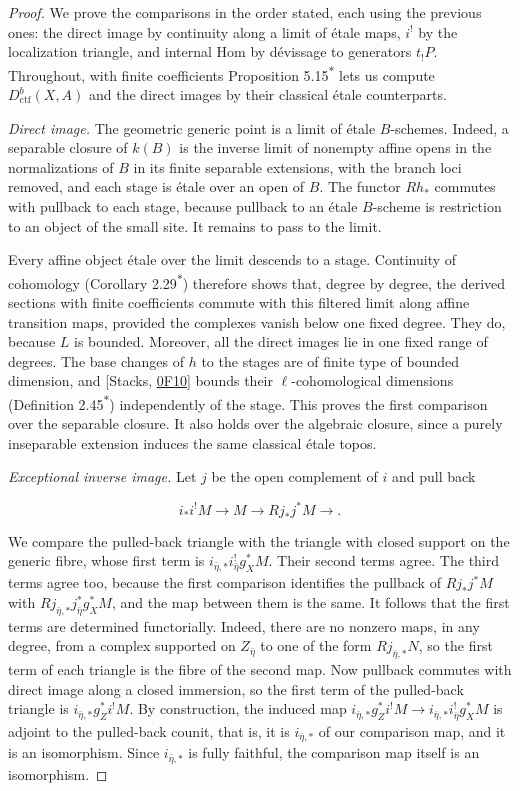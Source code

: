 \documentclass[11pt]{article}
\newcommand{\bpout}[1]{#1\textsuperscript{\hyperlink{bp-outside}{\ensuremath{\ast}}}}
\begin{document}
\begin{proof}[{Proof}]\label{bp20}%
We prove the comparisons in the order stated, each using the previous ones: the direct image by continuity along a limit of étale maps, \(i^!\) by the localization triangle, and internal Hom by dévissage to generators \(t_!P\). Throughout, with finite coefficients Proposition \bpout{5.15} lets us compute \(D^b_{\mathrm{ctf}}(X,A)\) and the direct images by their classical étale counterparts.

\emph{Direct image.} The geometric generic point is a limit of étale \(B\)-schemes. Indeed, a separable closure of \(k(B)\) is the inverse limit of nonempty affine opens in the normalizations of \(B\) in its finite separable extensions, with the branch loci removed, and each stage is étale over an open of \(B\). The functor \(Rh_*\) commutes with pullback to each stage, because pullback to an étale \(B\)-scheme is restriction to an object of the small site. It remains to pass to the limit.

Every affine object étale over the limit descends to a stage. Continuity of cohomology (Corollary \bpout{2.29}) therefore shows that, degree by degree, the derived sections with finite coefficients commute with this filtered limit along affine transition maps, provided the complexes vanish below one fixed degree. They do, because \(L\) is bounded. Moreover, all the direct images lie in one fixed range of degrees. The base changes of \(h\) to the stages are of finite type of bounded dimension, and [Stacks, \href{https://stacks.math.columbia.edu/tag/0F10}{0F10}] bounds their \(\ell\)-cohomological dimensions (Definition \bpout{2.45}) independently of the stage. This proves the first comparison over the separable closure. It also holds over the algebraic closure, since a purely inseparable extension induces the same classical étale topos.

\emph{Exceptional inverse image.} Let \(j\) be the open complement of \(i\) and pull back

\[
i_*i^!M\longrightarrow M\longrightarrow Rj_*j^*M
\longrightarrow.
\]

We compare the pulled-back triangle with the triangle with closed support on the generic fibre, whose first term is \(i_{\bar\eta,*}i_{\bar\eta}^!g_X^*M\). Their second terms agree. The third terms agree too, because the first comparison identifies the pullback of \(Rj_*j^*M\) with \(Rj_{\bar\eta,*}j_{\bar\eta}^*g_X^*M\), and the map between them is the same. It follows that the first terms are determined functorially. Indeed, there are no nonzero maps, in any degree, from a complex supported on \(Z_{\bar\eta}\) to one of the form \(Rj_{\bar\eta,*}N\), so the first term of each triangle is the fibre of the second map. Now pullback commutes with direct image along a closed immersion, so the first term of the pulled-back triangle is \(i_{\bar\eta,*}g_Z^*i^!M\). By construction, the induced map \(i_{\bar\eta,*}g_Z^*i^!M\to i_{\bar\eta,*}i_{\bar\eta}^!g_X^*M\) is adjoint to the pulled-back counit, that is, it is \(i_{\bar\eta,*}\) of our comparison map, and it is an isomorphism. Since \(i_{\bar\eta,*}\) is fully faithful, the comparison map itself is an isomorphism.


\end{proof}
\end{document}
